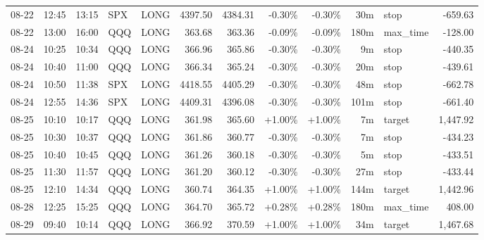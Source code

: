 \documentclass[11pt,a4paper]{article}
\begin{document}
\begin{center}
\begin{longtable}{>{\color{txtmain}}l l l l l r r r r r >{\color{txtmain}}l r}
08-22 & 12:45 & 13:15 & SPX & LONG & 4397.50 & 4384.31 & \textcolor{lossred}{-0.30\%} & \textcolor{lossred}{-0.30\%} & 30m & stop & \textcolor{lossred}{-659.63} \\
08-22 & 13:00 & 16:00 & QQQ & LONG & 363.68 & 363.36 & \textcolor{lossred}{-0.09\%} & \textcolor{lossred}{-0.09\%} & 180m & max\_time & \textcolor{lossred}{-128.00} \\
08-24 & 10:25 & 10:34 & QQQ & LONG & 366.96 & 365.86 & \textcolor{lossred}{-0.30\%} & \textcolor{lossred}{-0.30\%} & 9m & stop & \textcolor{lossred}{-440.35} \\
08-24 & 10:40 & 11:00 & QQQ & LONG & 366.34 & 365.24 & \textcolor{lossred}{-0.30\%} & \textcolor{lossred}{-0.30\%} & 20m & stop & \textcolor{lossred}{-439.61} \\
08-24 & 10:50 & 11:38 & SPX & LONG & 4418.55 & 4405.29 & \textcolor{lossred}{-0.30\%} & \textcolor{lossred}{-0.30\%} & 48m & stop & \textcolor{lossred}{-662.78} \\
08-24 & 12:55 & 14:36 & SPX & LONG & 4409.31 & 4396.08 & \textcolor{lossred}{-0.30\%} & \textcolor{lossred}{-0.30\%} & 101m & stop & \textcolor{lossred}{-661.40} \\
08-25 & 10:10 & 10:17 & QQQ & LONG & 361.98 & 365.60 & \textcolor{wingreen}{+1.00\%} & \textcolor{wingreen}{+1.00\%} & 7m & target & \textcolor{wingreen}{1,447.92} \\
08-25 & 10:30 & 10:37 & QQQ & LONG & 361.86 & 360.77 & \textcolor{lossred}{-0.30\%} & \textcolor{lossred}{-0.30\%} & 7m & stop & \textcolor{lossred}{-434.23} \\
08-25 & 10:40 & 10:45 & QQQ & LONG & 361.26 & 360.18 & \textcolor{lossred}{-0.30\%} & \textcolor{lossred}{-0.30\%} & 5m & stop & \textcolor{lossred}{-433.51} \\
08-25 & 11:30 & 11:57 & QQQ & LONG & 361.20 & 360.12 & \textcolor{lossred}{-0.30\%} & \textcolor{lossred}{-0.30\%} & 27m & stop & \textcolor{lossred}{-433.44} \\
08-25 & 12:10 & 14:34 & QQQ & LONG & 360.74 & 364.35 & \textcolor{wingreen}{+1.00\%} & \textcolor{wingreen}{+1.00\%} & 144m & target & \textcolor{wingreen}{1,442.96} \\
08-28 & 12:25 & 15:25 & QQQ & LONG & 364.70 & 365.72 & \textcolor{wingreen}{+0.28\%} & \textcolor{wingreen}{+0.28\%} & 180m & max\_time & \textcolor{wingreen}{408.00} \\
08-29 & 09:40 & 10:14 & QQQ & LONG & 366.92 & 370.59 & \textcolor{wingreen}{+1.00\%} & \textcolor{wingreen}{+1.00\%} & 34m & target & \textcolor{wingreen}{1,467.68} \\

\end{longtable}
\end{center}
\end{document}
